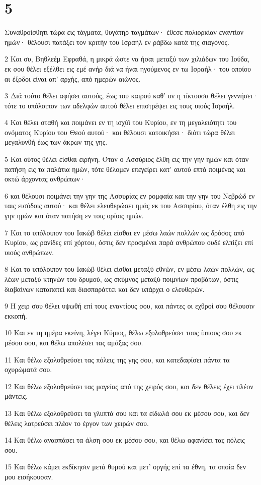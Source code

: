 \chapter{5}

\par Συναθροίσθητι τώρα εις τάγματα, θυγάτηρ ταγμάτων· έθεσε πολιορκίαν εναντίον ημών· θέλουσι πατάξει τον κριτήν του Ισραήλ εν ράβδω κατά της σιαγόνος.
\par 2 Και συ, Βηθλεέμ Εφραθά, η μικρά ώστε να ήσαι μεταξύ των χιλιάδων του Ιούδα, εκ σου θέλει εξέλθει εις εμέ ανήρ διά να ήναι ηγούμενος εν τω Ισραήλ· του οποίου αι έξοδοι είναι απ' αρχής, από ημερών αιώνος.
\par 3 Διά τούτο θέλει αφήσει αυτούς, έως του καιρού καθ' ον η τίκτουσα θέλει γεννήσει· τότε το υπόλοιπον των αδελφών αυτού θέλει επιστρέψει εις τους υιούς Ισραήλ.
\par 4 Και θέλει σταθή και ποιμάνει εν τη ισχύϊ του Κυρίου, εν τη μεγαλειότητι του ονόματος Κυρίου του Θεού αυτού· και θέλουσι κατοικήσει· διότι τώρα θέλει μεγαλυνθή έως των άκρων της γης.
\par 5 Και ούτος θέλει είσθαι ειρήνη. Όταν ο Ασσύριος έλθη εις την γην ημών και όταν πατήση εις τα παλάτια ημών, τότε θέλομεν επεγείρει κατ' αυτού επτά ποιμένας και οκτώ άρχοντας ανθρώπων·
\par 6 και θέλουσι ποιμάνει την γην της Ασσυρίας εν ρομφαία και την γην του Νεβρώδ εν ταις εισόδοις αυτού· και θέλει ελευθερώσει ημάς εκ του Ασσυρίου, όταν έλθη εις την γην ημών και όταν πατήση εν τοις ορίοις ημών.
\par 7 Και το υπόλοιπον του Ιακώβ θέλει είσθαι εν μέσω λαών πολλών ως δρόσος από Κυρίου, ως ρανίδες επί χόρτου, όστις δεν προσμένει παρά ανθρώπου ουδέ ελπίζει επί υιούς ανθρώπων.
\par 8 Και το υπόλοιπον του Ιακώβ θέλει είσθαι μεταξύ εθνών, εν μέσω λαών πολλών, ως λέων μεταξύ κτηνών του δρυμού, ως σκύμνος μεταξύ ποιμνίων προβάτων, όστις διαβαίνων καταπατεί και διασπαράττει και δεν υπάρχει ο ελευθερών.
\par 9 Η χειρ σου θέλει υψωθή επί τους εναντίους σου, και πάντες οι εχθροί σου θέλουσιν εκκοπή.
\par 10 Και εν τη ημέρα εκείνη, λέγει Κύριος, θέλω εξολοθρεύσει τους ίππους σου εκ μέσου σου, και θέλω απολέσει τας αμάξας σου.
\par 11 Και θέλω εξολοθρεύσει τας πόλεις της γης σου, και κατεδαφίσει πάντα τα οχυρώματά σου.
\par 12 Και θέλω εξολοθρεύσει τας μαγείας από της χειρός σου, και δεν θέλεις έχει πλέον μάντεις.
\par 13 Και θέλω εξολοθρεύσει τα γλυπτά σου και τα είδωλά σου εκ μέσου σου, και δεν θέλεις λατρεύσει πλέον το έργον των χειρών σου.
\par 14 Και θέλω ανασπάσει τα άλση σου εκ μέσου σου, και θέλω αφανίσει τας πόλεις σου.
\par 15 Και θέλω κάμει εκδίκησιν μετά θυμού και μετ' οργής επί τα έθνη, τα οποία δεν μου εισήκουσαν.


